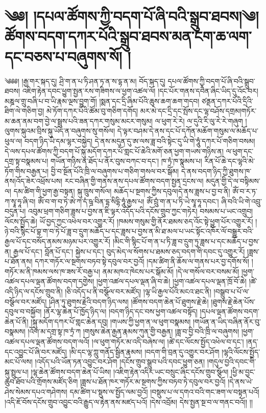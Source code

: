 \setcounter{footnote}{0} 
\chapter{༄༅། །དཔལ་ཚོགས་ཀྱི་བདག་པོ་ཞི་བའི་སྒྲུབ་ཐབས།༄། ཚོགས་བདག་དཀར་པོའི་སྒྲུབ་ཐབས་མན་ངག་ཆ་ལག་དང་བཅས་པ་བཞུགས་སོ། །}༄༅༅། །རྒྱ་གར་སྐད་དུ། ཤྲི་ག་ན་པ་ཏི་ཤན་ཏ་ན་ས་དྷ་ན་མ། བོད་སྐད་དུ། དཔལ་ཚོགས་ཀྱི་བདག་པོ་ཞི་བའི་སྒྲུབ་ཐབས། འཇིག་རྟེན་དབང་ཕྱུག་སྤྱན་རས་གཟིགས་ལ་ཕྱག་འཚལ་ལོ། །དང་པོར་གནས་དབཻན་ཞིང་ཡིད་དུ་འོང་བར། མཎྜལ་གྲུ་བཞི་པ་བ་ཡི་རྣམ་ལྔས་བྱུག་གོ། །སྨན་དང་དྲི་ཞིམ་པོའི་ཆུས་ཆག་ཆག་གདབ། ཙནྡན་དཀར་པོའི་དྲིའི་ཐིག་ལེ་གཅིག་བྱ། མེ་ཏོག་དཀར་པོའི་ཚོམ་བུ་གཅིག་དགོད། མར་མེ་དང་དྲི་དང་སྤོས་དང་ལྷ་བཤོས་དགྲམ།གཏོར་མ་ཆན་ནམ་བག་བྱེ་ལ་སྦྲུས་པའི་ཟན་དཀར་གསུམ་མངར་གསུམ། ལ་ཕུག་རེ་རེ། ལ་དུའི་རི་ལུ་རེ་རེ་གཞུག །ལུགས་སྐུའམ་བྲིས་སྐུ་ཡོད་ན་བཞུགས་སུ་གསོལ། དེ་ལྟར་བཤམ་དེ་ནས་དང་པོ་དཀོན་མཆོག་གསུམ་ལ་མཆོད་པ་ཕུལ་ལ། བདག་ཉིད་ཡི་དམ་ལྷར་བསྐྱེད། དེ་ནས་མདུན་དུ་ཨ་ལས་ཟླ་བའི་སྟེང་དུ་ཡི་གེ་ཧཱུཾ་དཀར་པོ་གཅིག་བསམ། དེ་ལས་དཔལ་ཚོགས་ཀྱི་བདག་པོ་སྐུ་མདོག་དཀར་པོ་གླང་པོ་ཆེའི་མགོ་ཅན་ཕྱག་གཡས་གཉིས་ན། ལ་ཕུག་དང་དགྲ་སྟ་བསྣམས་པ། གཡོན་གཉིས་ན་ཐོད་པ་ནོར་བུས་བཀང་བ་དང་། ཁ་ཏྲཾ་ཁ་སྣམས་པ། རིན་པོ་ཆེ་དང་ལྷའི་མེ་ཏོག་གིས་བརྒྱན་པ། བྱི་བ་སྔོན་པོའི་ཁྲི་ལ་བཞུགས་པ་གཅིག་གསལ་བར་སྒོམ། དེ་ནས་བདག་ཉིད་ཀྱི་ཐུགས་ཁ་ནས།འོད་ཟེར་འཕྲོས་པས། རང་བཞིན་གྱི་གནས་ནས་དཔལ་ཚོགས་བདག་སྤྱན་དྲངས་ལ། མདུན་གྱི་དེ་ལ་བསྟིམས་ལ། དམ་ཚིག་གི་ཕྱག་རྒྱ་བསྟན། སྐུ་ཁྲུས་གསོལ། མཆོད་པ་སྔགས་ཀྱིས་དབུལ།དེ་ནས་ཟླས་པ་བྱ་བ་ནི། ཨོཾ་བ་ར་ཏ་ཀ་སྭཱ་ཧཱ་ཞི་བ། ཨོཾ་བ་ག་བ་ཏེ་ཨེ་ཀ་དཾ་ཥྜ་བིན་དྷ་སིདྷི་ཧཱུཾ་རྒྱས་པ། ཨོཾ་བྲུཾ་ག་ན་པ་ཏི་ཡེ་སྭཱ་ཧཱ་དབང་། ཞི་བའི་ཡི་གེ་འབྲུ་བདུན་པ། འབུམ་ཕྲག་གཅིག་ཟླས་པ་བྱས་ན་ཇི་ལྟར་འདོད་པའི་དངོས་གྲུབ་ཀྱང་གཏེར། བསམས་པ་ཡང་འགྲུབ། ལོངས་སྤྱོད་ཆེ། ཡོ་བྱད་ཀྱང་འཕེལ་བར་འགྱུར་རོ། །ཁམས་གསུམ་གྱི་ནོར་ཐམས་ཅད་འོང་སྟེ་ཕྱུག་པོར་འགྱུར་རོ། །ཉེ་བའི་སྙིང་པོ་བྷ་ག་བ་ཏེ་པོ་ཟླ་བ་དྲུག་མཆོད་པ་དང་ཟླས་པ་བྱས་ན་མི་ཐ་མལ་པ་ཡང་སྟོང་འཁོར་ལོ་བསྒྱུར་བའི་རྒྱལ་པོ་དང་བསོད་ནམས་མཉམ་པར་འགྱུར་རོ། །མིང་གི་སྙིང་པོ་ག་ན་པ་ཏི་ཟླ་བ་དྲུག་ཏུ་ཟླས་པ་དང་མཆོད་པ་བྱས་ན། རྒྱལ་པོ་དང་། བློན་པོ་དང་། སྐྱེས་པ་དང་། བུད་མེད་ལ་སོགས་པ་ཐམས་ཅད་བདག་གི་དབང་དུ་འགྱུར་རོ། །ཟླས་པ་ཐོན་ནས། དཀར་གཏོར་ལ་སྔགས་བཏབ་སྟེ་དབུལ་བར་བྱའོ། །དམ་ཚིག་ནི་ཆོས་ལ་གནས་པར་བྱ་དགོས་སོ། །གཏོར་མ་ནི་ཁམས་ལས་ཁ་ཟས་རོ་བརྒྱ་པ། ནམ་མཁའ་ཁེངས་པར་སྒོམ་མོ། །དེ་ལ་གསོལ་བར་བསམ་མོ། །ཕྱག་འཚལ་དཔལ་ལྡན་ཚོགས་བདག་དགྱེས། །ཕྱག་འཚལ་དཔལ་ལྡན་ཞི་བ་ཆེ། །ཕྱག་འཚལ་དཔལ་ལྡན་ཁྲོ་བོ་ཆེ། །ཚེ་འདི་ཉིད་ལ་དངོས་གྲུབ་ནི། །ཅི་འདོད་པ་ནི་བསྩོལ་བར་མཛོད། །ལྷ་ཡི་རྒྱལ་པོའི་མངའ་ཐང་ནི། །བསྒྲུབ་པ་པོ་ལ་བསྩོལ་བར་མཛོད། །ཤིན་ཏུ་ཐུགས་རྗེའི་བདག་ཉིད་ལས། །ཚོགས་བདག་ཆེན་པོ་ཐུགས་རྗེ་ཆེ། །ཐུགས་རྗེ་ཆེན་པོས་དབུལ་བ་བསྐྱོབ། །ནོར་ལྷ་ཆེན་པོ་ཁྱོད་ཉིད་ལ། །བདག་ཉིད་དང་བས་ཕྱག་འཚལ་བསྟོད། །དཔལ་ལྡན་ཚོགས་བདག་ཆེན་པོ་ནི། །སྐུ་མདོག་དཀར་པོ་གླང་ཆེན་དབུ། །གཡས་ཀྱི་ཕྱག་ན་ལ་ཕུག་བསྣམས། །གཡོན་ན་ཡིད་བཞིན་ནོར་བུ་བསྣམས། །འོག་མ་དགྲ་སྟ་ཁ་ཏྲཾ་ཀ །གསུས་ཆེན་རྒྱན་རྣམས་ཀུན་གྱི་བརྒྱན། །ཟླ་བ་བྱི་བའི་ཁྲི་ལ་བཞུགས། །ཕྱག་འཚལ་དཔལ་ལྡན་ཚོགས་བདག་ལའོ། །ལ་ཕུག་གཏོར་མ་འདི་བཞེས་ལ། །ཚེ་དང་ལོངས་སྤྱོད་འཕེལ་བ་དང་། །ནད་དང་འབྱུང་པོ་ཞི་བར་མཛོད། །མི་དང་ལྷ་ཀླུ་གནོད་སྦྱིན་རྣམས། །བདག་གི་བྲན་དུ་འགྱུར་བར་ཤོག །ལྷའི་ལོངས་སྤྱོད་མང་པོ་ལས། །འདོད་པའི་ཡོན་ཏན་འབྱུང་བར་ཤོག །དངོས་གྲུབ་སྒྲུབ་པའི་དབང་ཕྱུག་ཅན། །གདུལ་བྱའི་དབང་གི་སྐུ་སྤྲུལ་པ། །ལྷ་ཆེན་ཚོགས་བདག་ཆེན་པོ་ཡིས། །འཇིག་རྟེན་འདིར་ཡང་བསྲུང་ཞིང་དངོས་གྲུབ་སྩོལ། །ཕྱི་མ་བྱང་ཆུབ་ཐོབ་པའི་གྲོགས་མཛོད་ཅིག །ཟླས་པ་ཐོན་ཁར་གཏོར་མ་སྔགས་ཀྱིས་བཏབ་ཏེ་དབུལ་བར་བྱའོ། །དེ་ནས་ཡེ་ཤེས་སེམས་དཔའ་གཤེགས། དམ་ཚིག་པ་སྡུས་ལ་སྤྱོད་ལམ་བྱའོ། །བསྡུས་པ་ལ་དགའ་བའི་གང་ཟག་ལ་བསྟན་པའོ། །འདི་ཇོ་བོས་དངོས་གྲུབ་འབྱུང་བའི་རྒྱུད་ལ་རྟེན་ནས་མཛད་པའོ། །དེས་འབྲོམ། དེས་སྤྱན་སྔ་བ་ལ་གནང་བའོ།། །།